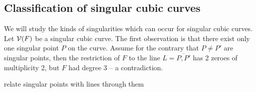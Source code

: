 \subsection{Classification of singular cubic curves}

We will study the kinds of singularities which can occur for singular cubic curves.
Let $\operatorname{\mathcal V}(F)$ be a singular cubic curve.
The first observation is that there exist only one singular point $P$ on the curve.
Assume for the contrary that $P \neq P'$ are singular points, then the restriction of $F$ to the line $L = \overline{P,P'}$ has 2 zeroes of multiplicity 2, but $F$ had degree 3 -- a contradiction.

\begin{todo}
\item relate singular points with lines through them
\end{todo}

\cite[Satz 4.9, p.102]{hulek2000elementare}
